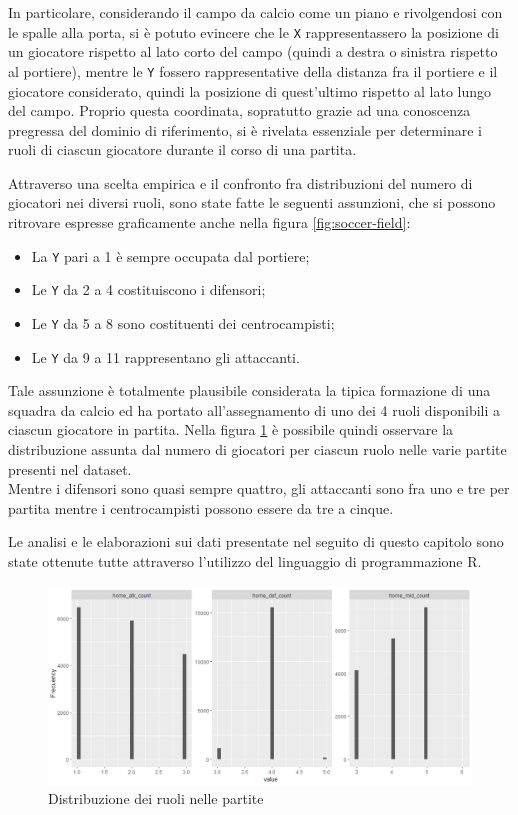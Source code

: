 \documentclass[hidelinks, 12pt]{article}
\begin{document}
In particolare, considerando il campo da calcio come un piano e rivolgendosi con le spalle alla porta, si è potuto evincere che le \texttt{X} rappresentassero la posizione di un giocatore rispetto al lato corto del campo (quindi a destra o sinistra rispetto al portiere), mentre le \texttt{Y} fossero rappresentative della distanza fra il portiere e il giocatore considerato, quindi la posizione di quest'ultimo rispetto al lato lungo del campo. Proprio questa coordinata, sopratutto grazie ad una conoscenza pregressa del dominio di riferimento, si è rivelata essenziale per determinare i ruoli di ciascun giocatore durante il corso di una partita.

Attraverso una scelta empirica e il confronto fra distribuzioni del numero di giocatori nei diversi ruoli, sono state fatte le seguenti assunzioni, che si possono ritrovare espresse graficamente anche nella figura \ref{fig:soccer-field}:

\begin{itemize}
	\item La \texttt{Y} pari a 1 è sempre occupata dal portiere;
	\item Le \texttt{Y} da 2 a 4 costituiscono i difensori;
	\item Le \texttt{Y} da 5 a 8 sono costituenti dei centrocampisti;
	\item Le \texttt{Y} da 9 a 11 rappresentano gli attaccanti.
\end{itemize}

Tale assunzione è totalmente plausibile considerata la tipica formazione di una squadra da calcio ed ha portato all'assegnamento di uno dei 4 ruoli disponibili a ciascun giocatore in partita. Nella figura \ref{fig:dataset-roles-distr} è possibile quindi osservare la distribuzione assunta dal numero di giocatori per ciascun ruolo nelle varie partite presenti nel dataset. \\
Mentre i difensori sono quasi sempre quattro, gli attaccanti sono fra uno e tre per partita mentre i centrocampisti possono essere da tre a cinque.

\vspace{2ex}

Le analisi e le elaborazioni sui dati presentate nel seguito di questo capitolo sono state ottenute tutte attraverso l'utilizzo del linguaggio di programmazione R.

\begin{figure}[H]
	\centering
	\includegraphics[scale=0.6]{images/04_01_roles_distribution.png}
	\caption[Distribuzione dei ruoli nelle partite]{Distribuzione dei ruoli nelle partite}
	\label{fig:dataset-roles-distr}
\end{figure}
\end{document}
